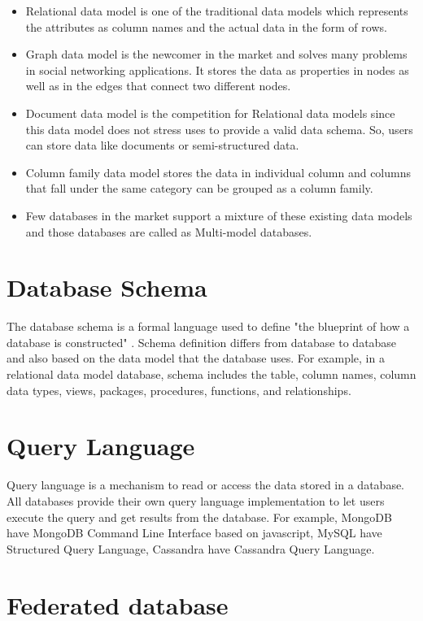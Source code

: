     \begin{itemize}
    	\item Relational data model is one of the traditional data models which represents the attributes as column names and the actual data in the form of rows.
    	\item Graph data model is the newcomer in the market and solves many problems in social networking applications. It stores the data as properties in nodes as well as in the edges that connect two different nodes.
    	\item Document data model is the competition for Relational data models since this data model does not stress uses to provide a valid data schema. So, users can store data like documents or semi-structured data. 
    	\item Column family data model stores the data in individual column and columns that fall under the same category can be grouped as a column family.  
    	\item Few databases in the market support a mixture of these existing data models and those databases are called as Multi-model databases.
    \end{itemize}
	
	\section{Database Schema}
	The database schema is a formal language used to define "the blueprint of how a database is constructed" \cite{misc09}. Schema definition differs from database to database and also based on the data model that the database uses. For example, in a relational data model database, schema includes the table, column names, column data types, views, packages, procedures, functions, and relationships. 

	\section{Query Language}
	Query language is a mechanism to read or access the data stored in a database.  All databases provide their own query language implementation to let users execute the query and get results from the database. For example, MongoDB have MongoDB Command Line Interface based on javascript, MySQL have Structured Query Language, Cassandra have Cassandra Query Language.
	
	\section{Federated database}
	
